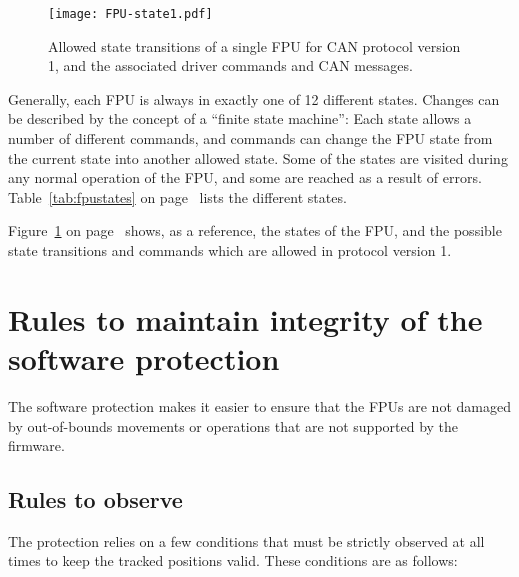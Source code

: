 \documentclass[11pt,a4paper]{scrartcl}
\begin{document}
\begin{figure}
  \texttt{[image: FPU-state1.pdf]}
  \caption{Allowed state transitions of a single FPU for CAN protocol
    version 1, and the associated driver commands and CAN messages.}
  \label{fig:states}
\end{figure}


Generally, each FPU is always in exactly one of 12 different states.
Changes can be described by the concept of a ``finite state machine'':
Each state allows a number of different commands, and commands can
change the FPU state from the current state into another allowed
state.  Some of the states are visited during any normal operation of
the FPU, and some are reached as a result of errors.
Table~\ref{tab:fpustates} on page~\pageref{tab:fpustates} lists the
different states.


Figure~\ref{fig:states} on page~\pageref{fig:states} shows, as a
reference, the states of the FPU, and the possible state transitions
and commands which are allowed in protocol version 1.


\section{Rules to maintain integrity of the software protection}
\label{sec:protectionrules}

The software protection makes it easier to ensure that the FPUs are
not damaged by out-of-bounds movements or operations that are not
supported by the firmware.

\subsection{Rules to observe}
The protection relies on a few conditions that must be strictly
observed at all times to keep the tracked positions valid. These
conditions are as follows:
\end{document}
